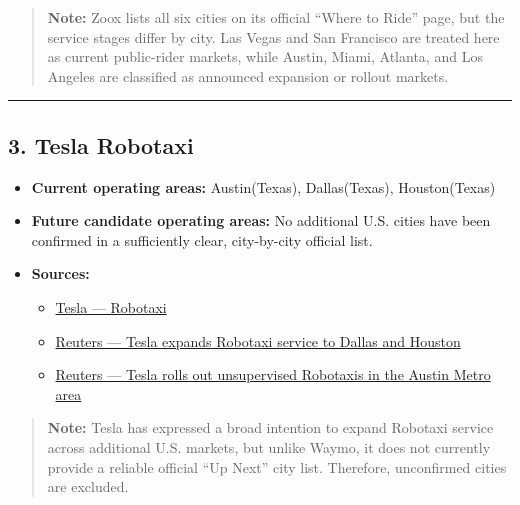 \documentclass[10pt,a4paper]{article}
\providecommand{\tightlist}{\setlength{\itemsep}{0pt}\setlength{\parskip}{0pt}}
\begin{document}
\begin{quote}
\textbf{Note:} Zoox lists all six cities on its official ``Where to Ride'' page, but the service stages differ by city. Las Vegas and San Francisco are treated here as current public-rider markets, while Austin, Miami, Atlanta, and Los Angeles are classified as announced expansion or rollout markets.
\end{quote}

\begin{center}\rule{0.5\linewidth}{0.5pt}\end{center}

\hypertarget{tesla-robotaxi}{%
\subsection{3. Tesla Robotaxi}\label{tesla-robotaxi}}

\begin{itemize}
\item
  \textbf{Current operating areas:} Austin(Texas), Dallas(Texas), Houston(Texas)
\item
  \textbf{Future candidate operating areas:} No additional U.S. cities have been confirmed in a sufficiently clear, city-by-city official list.
\item
  \textbf{Sources:}

  \begin{itemize}
  \tightlist
  \item
    \href{https://www.tesla.com/robotaxi}{Tesla --- Robotaxi}
  \item
    \href{https://www.reuters.com/business/autos-transportation/tesla-rolls-out-robotaxis-dallas-houston-2026-04-18/}{Reuters --- Tesla expands Robotaxi service to Dallas and Houston}
  \item
    \href{https://www.reuters.com/business/autos-transportation/tesla-rolls-out-unsupervised-robotaxis-austin-2026-06-03/}{Reuters --- Tesla rolls out unsupervised Robotaxis in the Austin Metro area}
  \end{itemize}
\end{itemize}

\begin{quote}
\textbf{Note:} Tesla has expressed a broad intention to expand Robotaxi service across additional U.S. markets, but unlike Waymo, it does not currently provide a reliable official ``Up Next'' city list. Therefore, unconfirmed cities are excluded.
\end{quote}
\end{document}
